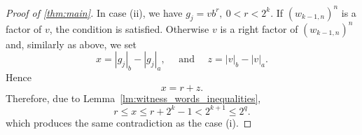 \begin{proof}[Proof of \autoref*{thm:main}]
    In case (ii), we have $g_j = v b^{r}, \: 0 < r < 2^k$. If ${(w_{k-1,n})}^{n}$ is a factor of $v$, the condition is satisfied. Otherwise $v$ is a right factor of ${(w_{k-1,n})}^{n}$ and, similarly as above, we set
    \[
        x = |g_j|_b - |g_j|_a, \quad \text{ and } \quad z = |v|_b - |v|_a.
    \]
    Hence
    \[
        x = r + z.
    \]
    Therefore, due to Lemma~\ref*{lm:witness_words_inequalities},
    \[
        r \leq x \leq r + 2^k - 1 < 2^{k+1} \leq 2^q.
    \]
    which produces the same contradiction as the case (i).
\end{proof}